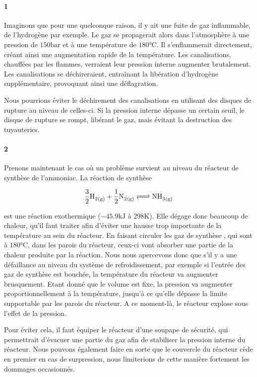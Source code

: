 \paragraph{1} Imaginons que pour une quelconque raison, il y ait une fuite de gaz inflammable, 
de l'hydrogène par exemple. Le gaz se propagerait alors dans l'atmosphère à 
une pression de $150\si{\bar}$ et à une température de $180\si{\celsius}$. 
Il s'enflammerait directement, créant ainsi une augmentation rapide de la température. 
Les canalisations, chauffées par les flammes, verraient leur pression interne augmenter 
brutalement. Les canalisations se déchireraient, entraînant la libération d'hydrogène 
supplémentaire, provoquant ainsi une déflagration.

Nous pourrions éviter le déchirement des canalisations en utilisant des disques de rupture 
au niveau de celles-ci. Si la pression interne dépasse un certain seuil, le disque de rupture 
se rompt, libérant le gaz, mais évitant la destruction des tuyauteries.

\paragraph{2} Prenons maintenant le cas où un problème survient au niveau du réacteur 
de synthèse de l'ammoniac. La réaction de synthèse

\begin{equation}
	\ce{\frac{3}{2} H2_{(g)} + \frac{1}{2} N2_{(g)} <=> NH3_{(g)}}
	\label{eq:synthesis}
\end{equation}

est une réaction exothermique ($-45.9\si{\kilo\joule}$ à $298\si{\kelvin}$). 
Elle dégage donc beaucoup de chaleur, qu'il faut traiter afin d'éviter 
une hausse trop importante de la température au sein du réacteur. 
En faisant circuler les gaz de synthèse ,  
qui sont à $180\si{\celsius}$, dans les parois du réacteur, 
ceux-ci vont absorber une partie de la chaleur produite par la réaction. 
Nous nous apercevons donc que s'il y a une défaillance au niveau du système 
de refroidissement, par exemple si l'entrée des gaz de synthèse est bouchée, 
la température du réacteur va augmenter brusquement. Etant donné que le volume est fixe, 
la pression va augmenter proportionnellement à la température, 
jusqu'à ce qu'elle dépasse la limite supportable par les parois du réacteur. 
A ce moment-là, le réacteur explose sous l'effet de la pression.

Pour éviter cela, il faut équiper le réacteur d'une soupape de sécurité, qui permettrait d'évacuer une partie du gaz afin de stabiliser la pression interne du réacteur. 
Nous pouvons également faire en sorte que le couvercle du réacteur cède en premier en cas de surpression, nous limiterions de cette manière fortement les dommages occasionnés.

